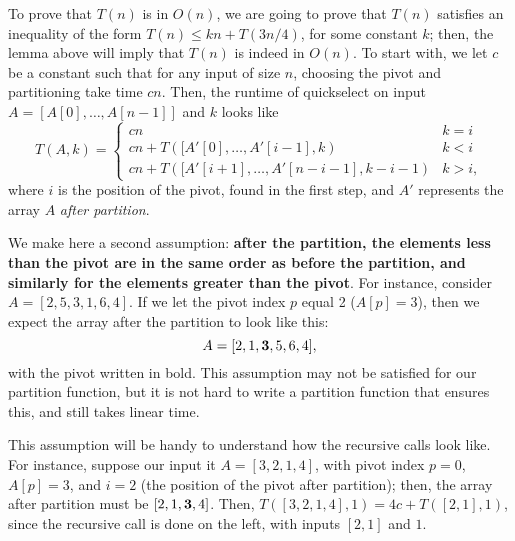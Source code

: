 \documentclass{report}
\begin{document}
To prove that $T(n)$ is in $O(n)$, we are going to prove that $T(n)$
satisfies an inequality of the form $T(n) \le kn + T(3n/4)$, for some
constant $k$; then, the lemma above will imply that $T(n)$ is indeed
in $O(n)$. To start with, we let $c$ be a constant such that for any
input of size $n$, choosing the pivot and partitioning take time $cn$.
Then, the runtime of quickselect on input $A=[A[0],\dots,A[n-1]]$ and $k$ 
looks like
\begin{equation}\label{eq:Trec}
T(A, k) = \begin{cases}
cn & k = i\\
cn + T([A'[0],\dots,A'[i-1], k) & k < i\\
cn + T([A'[i+1],\dots,A'[n-i-1], k-i-1) & k > i,
\end{cases}
\end{equation}
where $i$ is the position of the pivot, found in the first step,
and $A'$ represents the array $A$ {\em after partition}.

We make here a second assumption: \textbf{after the partition, the
  elements less than the pivot are in the same order as before the
  partition, and similarly for the elements greater than the
  pivot}. For instance, consider $A = [2, 5, 3, 1, 6, 4]$. If we let
the pivot index $p$ equal 2 ($A[p] = 3$), then we expect the array
after the partition to look like this:
$$A = [2, 1, {\bf 3}, 5, 6, 4],$$ with the pivot written in bold.
This assumption may not be satisfied for our partition function,
but it is not hard to write a partition function that ensures this,
and still takes linear time. 

This assumption will be handy to understand how the recursive calls
look like. For instance, suppose our input it $A=[3,2,1,4]$, with
pivot index $p=0$, $A[p]=3$, and $i=2$ (the position of the pivot
after partition); then, the array after partition must be $[2,1,{\bf
    3},4]$. Then, $T([3,2,1,4], 1)= 4c + T([2,1], 1)$, since the
recursive call is done on the left, with inputs $[2,1]$ and $1$.
\end{document}
